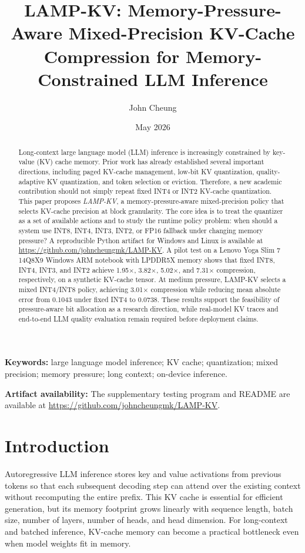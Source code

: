 \documentclass[11pt]{article}
\title{LAMP-KV: Memory-Pressure-Aware Mixed-Precision KV-Cache Compression for Memory-Constrained LLM Inference}
\author{John Cheung}
\affil{College of Professional and Continuing Education}
\date{May 2026}
\begin{document}
\maketitle

\begin{abstract}
Long-context large language model (LLM) inference is increasingly constrained by key-value (KV) cache memory. Prior work has already established several important directions, including paged KV-cache management, low-bit KV quantization, quality-adaptive KV quantization, and token selection or eviction. Therefore, a new academic contribution should not simply repeat fixed INT4 or INT2 KV-cache quantization. This paper proposes \emph{LAMP-KV}, a memory-pressure-aware mixed-precision policy that selects KV-cache precision at block granularity. The core idea is to treat the quantizer as a set of available actions and to study the runtime policy problem: when should a system use INT8, INT4, INT3, INT2, or FP16 fallback under changing memory pressure? A reproducible Python artifact for Windows and Linux is available at \url{https://github.com/johncheungmk/LAMP-KV}. A pilot test on a Lenovo Yoga Slim 7 14Q8X9 Windows ARM notebook with LPDDR5X memory shows that fixed INT8, INT4, INT3, and INT2 achieve 1.95$\times$, 3.82$\times$, 5.02$\times$, and 7.31$\times$ compression, respectively, on a synthetic KV-cache tensor. At medium pressure, LAMP-KV selects a mixed INT4/INT8 policy, achieving 3.01$\times$ compression while reducing mean absolute error from 0.1043 under fixed INT4 to 0.0738. These results support the feasibility of pressure-aware bit allocation as a research direction, while real-model KV traces and end-to-end LLM quality evaluation remain required before deployment claims.
\end{abstract}

\noindent\textbf{Keywords:} large language model inference; KV cache; quantization; mixed precision; memory pressure; long context; on-device inference.

\noindent\textbf{Artifact availability:} The supplementary testing program and README are available at \url{https://github.com/johncheungmk/LAMP-KV}.

\section{Introduction}
Autoregressive LLM inference stores key and value activations from previous tokens so that each subsequent decoding step can attend over the existing context without recomputing the entire prefix. This KV cache is essential for efficient generation, but its memory footprint grows linearly with sequence length, batch size, number of layers, number of heads, and head dimension. For long-context and batched inference, KV-cache memory can become a practical bottleneck even when model weights fit in memory.
\end{document}
